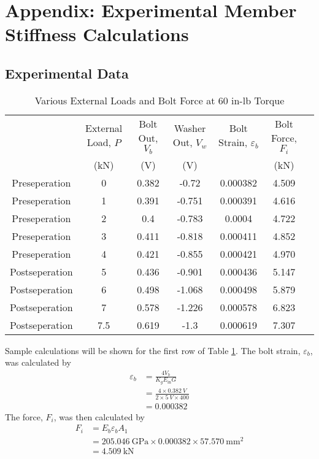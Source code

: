 \section{Appendix: Experimental Member Stiffness Calculations}
\label{sec:experimental_member_stiffness}
\subsection{Experimental Data}
\begin{table}[h]
    \centering
    \caption{Various External Loads and Bolt Force at 60 in-lb Torque}
    \label{tab:member_stiffness_data}
    \begin{tabular}{ccccccc}
    \toprule
    & External Load, $P$ & Bolt Out, $V_{b}$ & Washer Out, $V_{w}$ & Bolt Strain, $\varepsilon_b$ & Bolt Force, $F_i$ \\
    & (kN) & (V) & (V) & & (kN) \\
    \midrule
    Preseperation & 0 & 0.382 & -0.72 & 0.000382 & 4.509 \\
    Preseperation & 1 & 0.391 & -0.751 & 0.000391 & 4.616 \\
    Preseperation & 2 & 0.4 & -0.783 & 0.0004 & 4.722 \\
    Preseperation & 3 & 0.411 & -0.818 & 0.000411 & 4.852 \\
    Preseperation & 4 & 0.421 & -0.855 & 0.000421 & 4.970 \\
    Postseperation & 5 & 0.436 & -0.901 & 0.000436 & 5.147 \\
    Postseperation & 6 & 0.498 & -1.068 & 0.000498 & 5.879 \\
    Postseperation & 7 & 0.578 & -1.226 & 0.000578 & 6.823 \\
    Postseperation & 7.5 & 0.619 & -1.3 & 0.000619 & 7.307 \\
    \bottomrule
    \end{tabular}
\end{table}
Sample calculations will be shown for the first row of Table \ref{tab:member_stiffness_data}. The bolt strain, $\varepsilon_b$, was calculated by
\begin{align*}
    \varepsilon_b &= \frac{4 V_b}{K_g E_{\text{in}} G} \\
    &= \frac{4 \times \qty{0.382}{V}}{2 \times \qty{5}{V} \times 400} \\
    &= \qty{0.000382}{}
\end{align*}
The force, $F_i$, was then calculated by
\begin{align*}
    F_i &= E_b \varepsilon_b A_1 \\
    &= \qty{205.046}{\giga\pascal} \times \qty{0.000382} \times \qty{57.570}{\milli\meter\squared} \\
    &= \boxed{\qty{4.509}{\kilo\newton}}
\end{align*}

